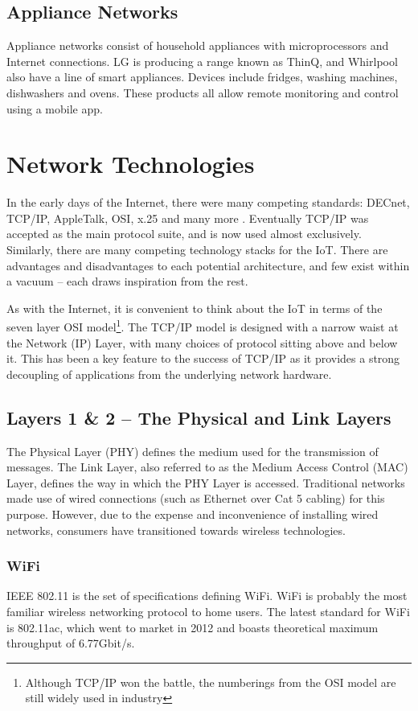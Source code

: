 \documentclass[10pt,journal,compsoc]{IEEEtran}
\begin{document}
\subsection{Appliance Networks} 
Appliance networks consist of household appliances with microprocessors and
Internet connections. LG is producing a range known as ThinQ, and Whirlpool
also have a line of smart appliances. Devices include fridges, washing
machines, dishwashers and ovens. These products all allow remote monitoring and
control using a mobile app. 

\section{Network Technologies}
In the early days of the Internet, there were many competing standards: DECnet,
TCP/IP, AppleTalk, OSI, x.25 and many more \cite{Cerf1993}. Eventually TCP/IP
was accepted as the main protocol suite, and is now used almost exclusively.
Similarly, there are many competing technology stacks for the IoT. There are
advantages and disadvantages to each potential architecture, and few exist
within a vacuum -- each draws inspiration from the rest. 

As with the Internet, it is convenient to think about the IoT in terms of the
seven layer OSI model\footnote{Although TCP/IP won the battle, the numberings
from the OSI model are still widely used in industry}. The TCP/IP model is
designed with a narrow waist at the Network (IP) Layer, with many choices of
protocol sitting above and below it. This has been a key feature to the success
of TCP/IP as it provides a strong decoupling of applications from the
underlying network hardware.

\subsection{Layers 1 \& 2 -- The Physical and Link Layers}
\label{layer_1_2}
The Physical Layer (PHY) defines the medium used for the transmission of
messages. The Link Layer, also referred to as the Medium Access Control
(MAC) Layer, defines the way in which the PHY Layer is accessed. Traditional
networks made use of wired connections (such as Ethernet over Cat 5 cabling)
for this purpose. However, due to the expense and inconvenience of installing
wired networks, consumers have transitioned towards wireless technologies. 

\subsubsection{WiFi}
IEEE 802.11 is the set of specifications defining WiFi. WiFi is probably the
most familiar wireless networking protocol to home users. The latest standard
for WiFi is 802.11ac, which went to market in 2012 and boasts theoretical
maximum throughput of 6.77Gbit/s. 
\end{document}
